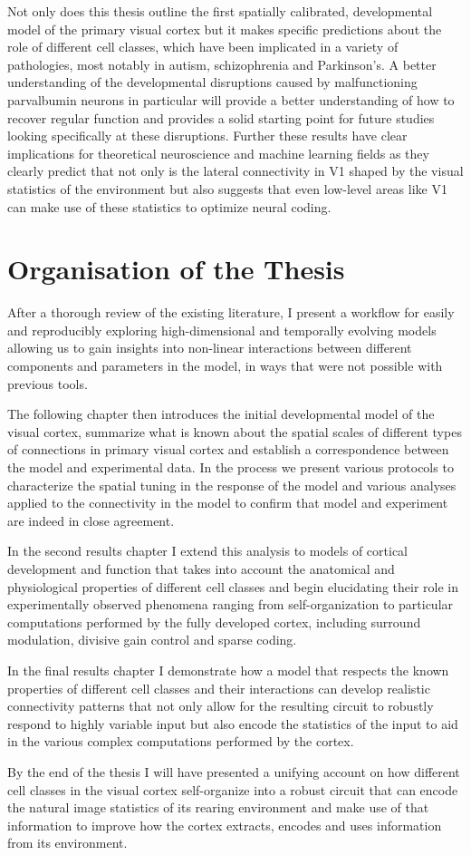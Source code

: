 Not only does this thesis outline the first spatially calibrated,
developmental model of the primary visual cortex but it makes specific
predictions about the role of different cell classes, which have been
implicated in a variety of pathologies, most notably in autism,
schizophrenia and Parkinson's. A better understanding of the
developmental disruptions caused by malfunctioning parvalbumin neurons
in particular will provide a better understanding of how to recover
regular function and provides a solid starting point for future
studies looking specifically at these disruptions. Further these
results have clear implications for theoretical neuroscience and
machine learning fields as they clearly predict that not only is the
lateral connectivity in V1 shaped by the visual statistics of the
environment but also suggests that even low-level areas like V1 can
make use of these statistics to optimize neural coding.

\section{Organisation of the Thesis}

After a thorough review of the existing literature, I present a
workflow for easily and reproducibly exploring high-dimensional and
temporally evolving models allowing us to gain insights into
non-linear interactions between different components and parameters in
the model, in ways that were not possible with previous tools.

The following chapter then introduces the initial developmental model
of the visual cortex, summarize what is known about the spatial scales
of different types of connections in primary visual cortex and
establish a correspondence between the model and experimental data. In
the process we present various protocols to characterize the spatial
tuning in the response of the model and various analyses applied to
the connectivity in the model to confirm that model and experiment are
indeed in close agreement.

In the second results chapter I extend this analysis to models of
cortical development and function that takes into account the
anatomical and physiological properties of different cell classes and
begin elucidating their role in experimentally observed phenomena
ranging from self-organization to particular computations performed by
the fully developed cortex, including surround modulation, divisive
gain control and sparse coding.

In the final results chapter I demonstrate how a model that respects
the known properties of different cell classes and their interactions
can develop realistic connectivity patterns that not only allow for
the resulting circuit to robustly respond to highly variable input but
also encode the statistics of the input to aid in the various complex
computations performed by the cortex.

By the end of the thesis I will have presented a unifying account on
how different cell classes in the visual cortex self-organize into a
robust circuit that can encode the natural image statistics of its
rearing environment and make use of that information to improve how
the cortex extracts, encodes and uses information from its
environment.
